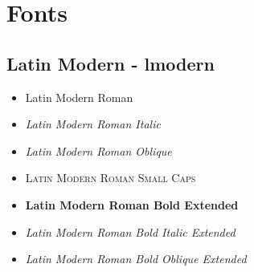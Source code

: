 %
%
%
%
%


\section{Fonts}

\subsection{Latin Modern - lmodern}
\fontencoding{\encodingdefault}
\fontfamily{\familydefault}
\fontseries{\seriesdefault}
\fontshape{\shapedefault}
\selectfont



{}


\begin{itemize}
\item            Latin Modern Roman
\item \itshape   Latin Modern Roman Italic
\item \slshape   Latin Modern Roman Oblique
\item \scshape   Latin Modern Roman Small Caps
\item \bfseries  Latin Modern Roman Bold Extended
\item \itshape   Latin Modern Roman Bold Italic Extended
\item \slshape   Latin Modern Roman Bold Oblique Extended
\end{itemize}


